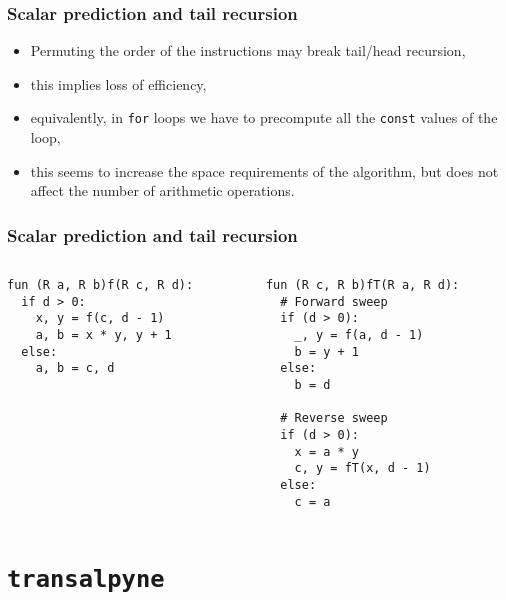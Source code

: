 \documentclass[10pt]{beamer}
\newcommand{\tALpy}{\texttt{transalpyne}}
\begin{document}

\begin{frame}
  \frametitle{Scalar prediction and tail recursion}

  \begin{itemize}
  \item Permuting the order of the instructions may break tail/head
    recursion,
  \item this implies loss of efficiency,
  \item equivalently, in {\tt for} loops we have to precompute all the
    {\tt const} values of the loop,
  \item \alert{this seems to increase the space requirements of the
      algorithm}, but does not affect the number of arithmetic operations.
  \end{itemize}
\end{frame}


\begin{frame}[fragile]
  \frametitle{Scalar prediction and tail recursion}

  \begin{columns}
    \begin{column}{0.5\textwidth}
\begin{lstlisting}
fun (R a, R b)f(R c, R d):
  if d > 0:
    x, y = f(c, d - 1)
    a, b = x * y, y + 1
  else:
    a, b = c, d
\end{lstlisting}
    \end{column}
    \begin{column}{0.5\textwidth}
\begin{lstlisting}
fun (R c, R b)fT(R a, R d):
  # Forward sweep
  if (d > 0):
    _, y = f(a, d - 1)
    b = y + 1
  else:
    b = d
    
  # Reverse sweep
  if (d > 0):
    x = a * y
    c, y = fT(x, d - 1)
  else:
    c = a
\end{lstlisting}      
    \end{column}
  \end{columns}
\end{frame}


\section{\tALpy}
\end{document}
